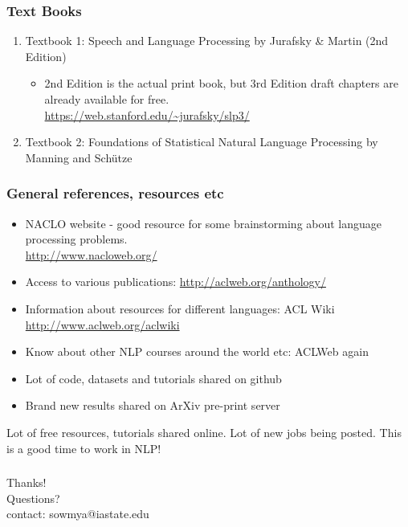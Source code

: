 \documentclass{beamer}
\begin{document}
\begin{frame}
\frametitle{Text Books}
\begin{enumerate}
\item Textbook 1: Speech and Language Processing by Jurafsky \& Martin (2nd Edition)
\begin{itemize}
\item 2nd Edition is the actual print book, but 3rd Edition draft chapters are already available for free. 
\\ \url{https://web.stanford.edu/~jurafsky/slp3/}
\end{itemize}
\item Textbook 2: Foundations of Statistical Natural Language Processing by Manning and Sch\"utze
\end{enumerate}
\end{frame}

\begin{frame}
\frametitle{General references, resources etc}
\begin{itemize}
\item NACLO website - good resource for some brainstorming about language processing problems. \\ \url{http://www.nacloweb.org/}
\item Access to various publications: \url{http://aclweb.org/anthology/} \\ 
\item Information about resources for different languages: ACL Wiki \url{http://www.aclweb.org/aclwiki}
\item Know about other NLP courses around the world etc: ACLWeb again
\item Lot of code, datasets and tutorials shared on github
\item Brand new results shared on ArXiv pre-print server
\end{itemize}
\pause Lot of free resources, tutorials shared online. Lot of new jobs being posted. This is a good time to work in NLP!
\end{frame}

\begin{frame}
\frametitle{}
\centering
Thanks! 
\\ Questions? \\ \bigskip
contact: sowmya@iastate.edu
\end{frame}
\end{document}

